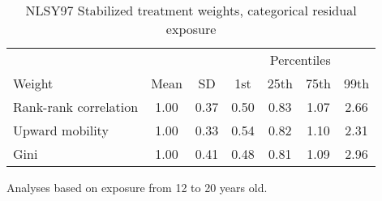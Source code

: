 \begin{table}[htp]
\centering
\footnotesize
\setlength{\tabcolsep}{10pt}
\renewcommand{\arraystretch}{1}
\begin{threeparttable}
\centering
\caption{NLSY97 Stabilized treatment weights, categorical residual exposure} 
\label{tab:ipt_weigths_qr}
\begin{tabular}{lcccccc}
  \hline
\multicolumn{3}{c}{} & \multicolumn{4}{c}{Percentiles} \\ 
 \cmidrule{4-7} 
Weight & Mean & SD & 1st & 25th & 75th & 99th \\ 
  \hline
Rank-rank correlation & 1.00 & 0.37 & 0.50 & 0.83 & 1.07 & 2.66 \\ 
  Upward mobility & 1.00 & 0.33 & 0.54 & 0.82 & 1.10 & 2.31 \\ 
  Gini & 1.00 & 0.41 & 0.48 & 0.81 & 1.09 & 2.96 \\ 
   \hline
\end{tabular}
\begin{tablenotes}
\footnotesize
\item Analyses based on exposure from 12 to 20 years old. 
\end{tablenotes}
\end{threeparttable}
\end{table}
